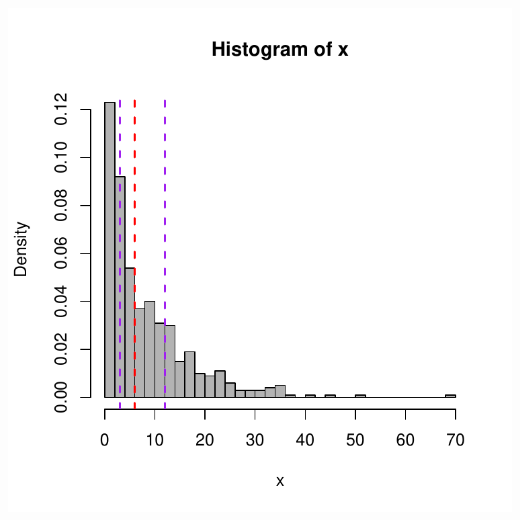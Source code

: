 \documentclass{beamer}\usepackage[]{graphicx}\usepackage[]{color}
\newenvironment{knitrout}{}{} %
\renewenvironment{knitrout}{\setlength{\topsep}{0mm}}{}
\begin{document}
\begin{frame}[fragile]
\begin{columns}[c]
\centering
\begin{knitrout}
\color{fgcolor}
\includegraphics[width=1.1\linewidth]{figure/unnamed-chunk-13-1} 

\end{knitrout}

\end{columns}

\end{frame} 
\end{document}
